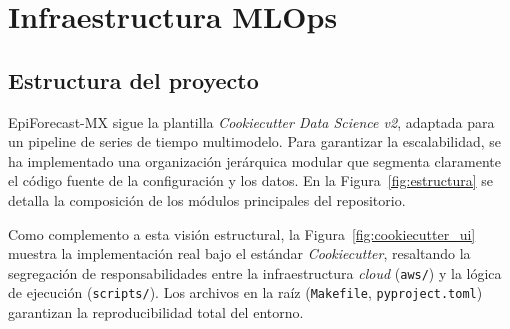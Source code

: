 \documentclass[12pt, letterpaper]{article}
\newcommand{\figref}[1]{Figura~\ref{#1}}
\begin{document}
\newpage
\section{Infraestructura MLOps}\label{sec:mlops}

\subsection{Estructura del proyecto}

EpiForecast-MX sigue la plantilla \textit{Cookiecutter Data Science v2}, adaptada para un pipeline de series de tiempo multimodelo. Para garantizar la escalabilidad, se ha implementado una organización jerárquica modular que segmenta claramente el código fuente de la configuración y los datos. En la \figref{fig:estructura} se detalla la composición de los módulos principales del repositorio.

Como complemento a esta visión estructural, la \figref{fig:cookiecutter_ui} muestra la implementación real bajo el estándar \textit{Cookiecutter}, resaltando la segregación de responsabilidades entre la infraestructura \textit{cloud} (\texttt{aws/}) y la lógica de ejecución (\texttt{scripts/}). Los archivos en la raíz (\texttt{Makefile}, \texttt{pyproject.toml}) garantizan la reproducibilidad total del entorno.
\end{document}

